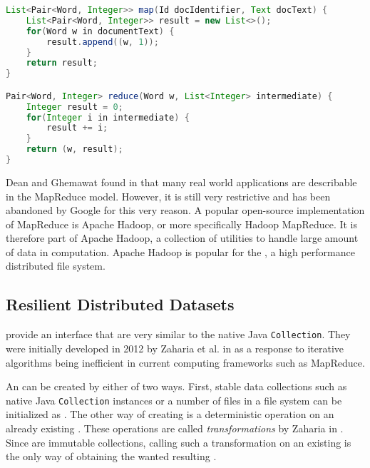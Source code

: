 \begin{lstlisting}[language=Java,caption={Example pseudocode implementation of the MapReduce model to count word occurrences.},label=lst:mapreduce]
List<Pair<Word, Integer>> map(Id docIdentifier, Text docText) {
	List<Pair<Word, Integer>> result = new List<>();
	for(Word w in documentText) {
		result.append((w, 1));
	}
	return result;
}

Pair<Word, Integer> reduce(Word w, List<Integer> intermediate) {
	Integer result = 0;
	for(Integer i in intermediate) {
		result += i;
	}
	return (w, result);
}

\end{lstlisting}
	
Dean and Ghemawat found in \cite{dean2008mapreduce} that many real world applications are describable in the MapReduce model. However, it is still very restrictive and has been abandoned by Google for this very reason. A popular open-source implementation of MapReduce is Apache Hadoop, or more specifically Hadoop MapReduce. It is therefore part of Apache Hadoop, a collection of utilities to handle large amount of data in computation. Apache Hadoop is popular for the \hdfs{}, a high performance distributed file system.

\subsection{Resilient Distributed Datasets}

\rdds{} provide an interface that are very similar to the native Java \lstinline|Collection|. They were initially developed in 2012 by Zaharia et al. in \cite{zaharia2012resilient} as a response to iterative algorithms being inefficient in current computing frameworks such as MapReduce.

An \rdd{} can be created by either of two ways. First, stable data collections such as native Java \lstinline|Collection| instances or a number of files in a file system can be initialized as \rdds{}. The other way of creating is a deterministic operation on an already existing \rdd{}. These operations are called \emph{transformations} by Zaharia in \cite{zaharia2012resilient}. Since \rdds{} are immutable collections, calling such a transformation on an existing \rdd{} is the only way of obtaining the wanted resulting \rdd{}.

